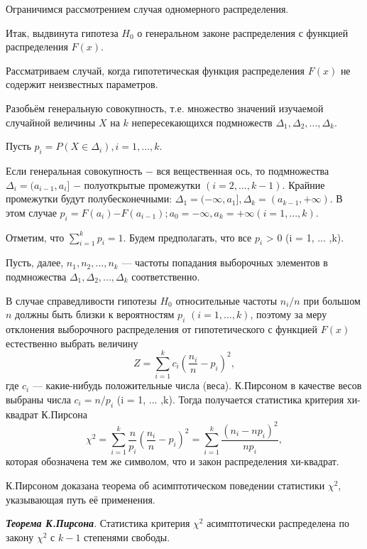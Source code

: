 \documentclass[a4paper]{article}
\begin{document}
Ограничимся рассмотрением случая одномерного распределения.

Итак, выдвинута гипотеза $H_{0}$ о генеральном законе распределения с функцией распределения $F(x)$.

Рассматриваем случай, когда гипотетическая функция распределения $F(x)$ не содержит неизвестных параметров.

Разобьём генеральную совокупность, т.е. множество значений изучаемой случайной величины $X$ на $k$ непересекающихся подмножеств $\Delta_{1},\Delta_{2}, ... ,\Delta_{k}$.

Пусть $p_{i} = P(X \in \Delta_{i}), i = 1, ... ,k$. 

Если генеральная совокупность $-$ вся вещественная ось, то подмножества $\Delta_i = (a_{i-1},a_{i}]$ $-$ полуоткрытые промежутки $(i = 2, ... ,k-1)$. Крайние промежутки будут полубесконечными: $\Delta_{1} = (-\infty,a_{1}], \Delta_{k} = (a_{k-1},+\infty).$ В этом случае $p_{i} = F(a_{i})$$-$$F(a_{i-1}); a_{0} = -\infty, a_{k} = +\infty (i = 1, ... ,k).$

Отметим, что $\sum_{i=1}^{k}{p_{i}} = 1$.
Будем предполагать, что все $p_{i}$ > 0 (i = 1, ... ,k).

Пусть, далее, $n_{1},n_{2}, ... ,n_{k}$ — частоты попадания выборочных элементов в подмножества $\Delta_{1},\Delta_{2}, ... ,\Delta_{k}$ соответственно.

В случае справедливости гипотезы $H_{0}$ относительные частоты $n_{i}/n$ при большом $n$ должны быть близки к вероятностям $p_{i}$ $(i = 1, ... ,k)$, поэтому за меру отклонения выборочного распределения от гипотетического с функцией $F(x)$ естественно выбрать величину
\begin{equation}
Z = \sum_{i = 1}^{k}{c_{i}(\frac{n_{i}}{n} - p_{i})^{2}}, 
\label{Z}
\end{equation}
где $c_{i}$ — какие-нибудь положительные числа (веса). К.Пирсоном в качестве весов выбраны числа $c_{i} = n/p_{i}$ (i = 1, ... ,k). Тогда получается статистика критерия хи-квадрат К.Пирсона
\begin{equation}
\chi^{2} = \sum_{i = 1}^{k}{\frac{n}{p_{i}}(\frac{n_{i}}{n} - p_{i})^{2}} = \sum_{i = 1}^{k}{\frac{(n_{i} - np_{i})^{2}}{np_{i}}}, 
\label{chi_2}
\end{equation}
которая обозначена тем же символом, что и закон распределения хи-квадрат.

К.Пирсоном доказана теорема об асимптотическом поведении статистики $\chi^{2}$, указывающая путь её применения.

\textbf{\textit{Теорема К.Пирсона}}. Статистика критерия $\chi^{2}$ асимптотически распределена по закону $\chi^{2}$ с $k-1$ степенями свободы.
\end{document}
